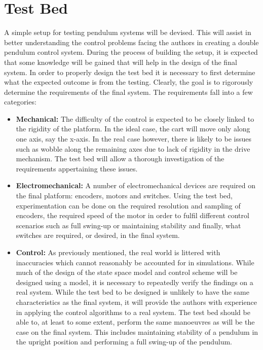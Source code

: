 
\section{Test Bed}
A simple setup for testing pendulum systems will be devised.
This will assist in better understanding the control problems facing the authors in creating a double pendulum control system.
During the process of building the setup, it is expected that some knowledge will be gained that will help in the design of the final system.
In order to properly design the test bed it is necessary to first determine what the expected outcome is from the testing.
Clearly, the goal is to rigorously determine the requirements of the final system.
The requirements fall into a few categories:

\begin{itemize}
	\item \textbf{Mechanical:} The difficulty of the control is expected to be closely linked to the rigidity of the platform.
	In the ideal case, the cart will move only along one axis, say the x-axis.
	In the real case however, there is likely to be issues such as wobble along the remaining axes due to lack of rigidity in the drive mechanism.
	The test bed will allow a thorough investigation of the requirements appertaining these issues.
	\item \textbf{Electromechanical:} A number of electromechanical devices are required on the final platform: encoders, motors and switches.
	Using the test bed, experimentation can be done on the required resolution and sampling of encoders, the required speed of the motor in order to fulfil different control scenarios such as full swing-up or maintaining stability and finally, what switches are required, or desired, in the final system.
	\item \textbf{Control:} As previously mentioned, the real world is littered with inaccuracies which cannot reasonably be accounted for in simulations.
	While much of the design of the state space model and control scheme will be designed using a model, it is necessary to repeatedly verify the findings on a real system.
	While the test bed to be designed is unlikely to have the same characteristics as the final system, it will provide the authors with experience in applying the control algorithms to a real system.
	The test bed should be able to, at least to some extent, perform the same manoeuvres as will be the case on the final system.
	This includes maintaining stability of a pendulum in the upright position and performing a full swing-up of the pendulum.
\end{itemize}

